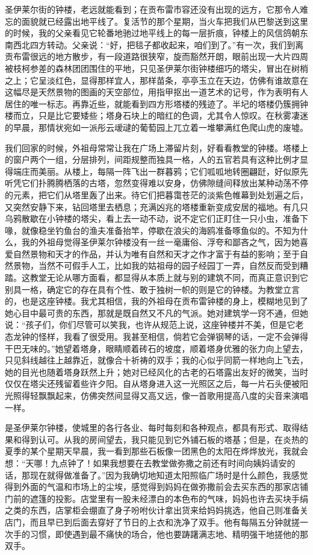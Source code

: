 \par 圣伊莱尔街的钟楼，老远就能看到；在贡布雷市容还没有出现的远方，它那令人难忘的面貌就已经露出地平线了。复活节的那个星期，当火车把我们从巴黎送到这里的时候，我的父亲看见它轮番地驰过地平线上的每一层折痕，钟楼上的风信鸽朝东南西北四方转动。父亲说：“好，把毯子都收起来，咱们到了。”有一次，我们到离贡布雷很远的地方散步，有一段道路很狭窄，旋而豁然开朗，眼前出现一大片四周被枝柯参差的森林团团围住的平地，只见圣伊莱尔街钟楼细巧的塔尖，冒出在树梢之上；它呈淡红色，显得那样宜人，那样苗条，亭亭玉立在天边，仿佛有谁故意在这幅尽是天然景物的图画的天空部位，用指甲抠出一道艺术的记号，作为表明有人居住的唯一标志。再靠近些，就能看到四方形塔楼的残迹了。半圮的塔楼仍簇拥钟楼而立，只是比它要矮些；塔身石块上的暗红的色调，尤其令人惊叹。在秋雾凄迷的早晨，那情状宛如一派彤云叆叇的葡萄园上兀立着一堆攀满红色爬山虎的废墟。
\par 我们回家的时候，外祖母常常让我在广场上滞留片刻，好看看教堂的钟楼。塔楼上的窗户两个一组，分层排列，间距规整而独具一格，人的五官若具有这种比例才显得端庄而美丽。从楼上，每隔一阵飞出一群暮鸦；它们呱呱地转圈翩跹，好似原先听凭它们扑腾腾栖落的古塔，忽然变得难以安身，仿佛隙缝间释放出某种动荡不停的元素，把它们从塔里轰了出来。待它们把暮霭苍茫的淡紫色帷幕到处划遍之后，又突然安静下来，钻回塔里去栖息；充满凶兆的塔楼重新变成安居的福地。有几只乌鸦散歇在小钟楼的塔尖，看上去一动不动，说不定它们正盯住一只小虫，准备下喙，就像稳坐钓鱼台的渔夫准备抬竿，停歇在浪尖的海鸥准备啄鱼似的。不知为什么，我的外祖母觉得圣伊莱尔钟楼没有一丝一毫庸俗、浮夸和鄙吝之气，因为她喜爱自然景物和天才的作品，并认为唯有自然和天才之作才富于有益的影响；至于自然景物，当然不可假手人工，比如我的姑祖母的园子经园丁一弄，自然反而受到糟踏。这教堂无论从哪方面看，都显得从本质上就与别的建筑不同，而真正意识到它别具一格，确定它的存在具有个性、敢于独树一帜的则是它的钟楼。为教堂立言的，也是这座钟楼。我尤其相信，我的外祖母在贡布雷钟楼的身上，模糊地见到了她心目中最可贵的东西，那就是既自然又不凡的气派。她对建筑学一窍不通，但她说：“孩子们，你们尽管可以笑我，也许从规范上说，这座钟楼并不美，但是它老态龙钟的怪样，我看了很受用。我甚至相信，倘若它会弹钢琴的话，一定不会弹得干巴无味的。”她望着塔身，眼睛顺着砖石的坡度，顺着塔身优雅的张力向上望去，只见斜线越往上越靠近，就像合十祈祷的双手；我的心似乎同箭一样地向上飞去，她的目光也随着塔身跃然上升；她对已经风化的古老的石塔露出友好的微笑，当时仅仅在塔尖还残留着些许夕阳。自从塔身进入这一光照区之后，每一片石头便被阳光照得轻飘飘起来，仿佛突然间显得又高又远，像一首歌用提高八度的尖音来演唱一样。
\par 是圣伊莱尔钟楼，使城里的各行各业、每时每刻和各种观点，都具有形式、取得结果和得到认可。从我的房间望去，我只能见到它外铺石板的塔基；但是，在炎热的夏季的某个星期天早晨，我一看到那些石板像一团黑色的太阳在烨烨放光，我就会想：“天哪！九点钟了！如果我想要在去教堂做弥撒之前还有时间向姨妈请安的话，那现在就得做准备了。”因为我确切地知道太阳照临广场时是什么颜色，我感觉得到外面的气温和市场上的尘埃，感觉得到妈妈在做弥撒前会去买东西的那家店铺门前的遮篷的投影。店堂里有一股未经漂白的本色布的气味，妈妈也许去买块手绢之类的东西，店掌柜会绷直了身子吩咐伙计拿出货来给妈妈挑选，他自己则准备关店门，而且早已到后面去穿好了节日的上衣和洗净了双手。他有每隔五分钟就搓一次手的习惯，即使遇到最不痛快的场合，他也要踌躇满志地、精明强干地搓他的那双手。
